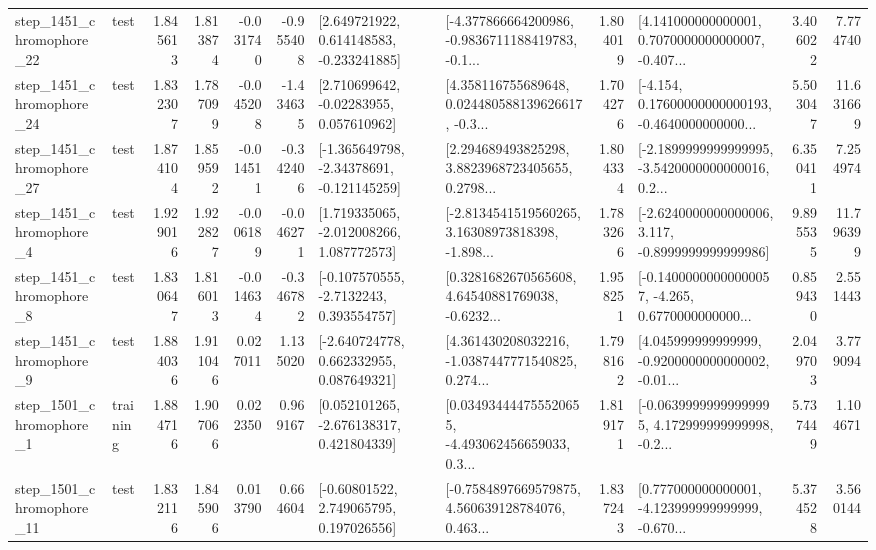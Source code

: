 \begin{tabular}{llrrrrllrlrr}
 step\_1451\_chromophore\_22 &      test &      1.845613 &    1.813874 &     -0.031740 & -0.955408 &    [2.649721922, 0.614148583, -0.233241885] &  [-4.377866664200986, -0.9836711188419783, -0.1... &       1.804019 &  [4.141000000000001, 0.7070000000000007, -0.407... &            3.406022 &          7.774740 \\
 step\_1451\_chromophore\_24 &      test &      1.832307 &    1.787099 &     -0.045208 & -1.434635 &     [2.710699642, -0.02283955, 0.057610962] &  [4.358116755689648, 0.024480588139626617, -0.3... &       1.704276 &  [-4.154, 0.17600000000000193, -0.4640000000000... &            5.503047 &         11.631669 \\
 step\_1451\_chromophore\_27 &      test &      1.874104 &    1.859592 &     -0.014511 & -0.342406 &   [-1.365649798, -2.34378691, -0.121145259] &  [2.294689493825298, 3.8823968723405655, 0.2798... &       1.804334 &  [-2.1899999999999995, -3.5420000000000016, 0.2... &            6.350411 &          7.254974 \\
  step\_1451\_chromophore\_4 &      test &      1.929016 &    1.922827 &     -0.006189 & -0.046271 &    [1.719335065, -2.012008266, 1.087772573] &  [-2.8134541519560265, 3.16308973818398, -1.898... &       1.783266 &  [-2.6240000000000006, 3.117, -0.8999999999999986] &            9.895535 &         11.796399 \\
  step\_1451\_chromophore\_8 &      test &      1.830647 &    1.816013 &     -0.014634 & -0.346782 &     [-0.107570555, -2.7132243, 0.393554757] &  [0.3281682670565608, 4.64540881769038, -0.6232... &       1.958251 &  [-0.14000000000000057, -4.265, 0.6770000000000... &            0.859430 &          2.551443 \\
  step\_1451\_chromophore\_9 &      test &      1.884036 &    1.911046 &      0.027011 &  1.135020 &    [-2.640724778, 0.662332955, 0.087649321] &  [4.361430208032216, -1.0387447771540825, 0.274... &       1.798162 &  [4.045999999999999, -0.9200000000000002, -0.01... &            2.049703 &          3.779094 \\
  step\_1501\_chromophore\_1 &  training &      1.884716 &    1.907066 &      0.022350 &  0.969167 &    [0.052101265, -2.676138317, 0.421804339] &  [0.034934444755520655, -4.493062456659033, 0.3... &       1.819171 &  [-0.06399999999999995, 4.172999999999998, -0.2... &            5.737449 &          1.104671 \\
 step\_1501\_chromophore\_11 &      test &      1.832116 &    1.845906 &      0.013790 &  0.664604 &     [-0.60801522, 2.749065795, 0.197026556] &  [-0.7584897669579875, 4.560639128784076, 0.463... &       1.837243 &  [0.777000000000001, -4.123999999999999, -0.670... &            5.374528 &          3.560144 \\

\end{tabular}

